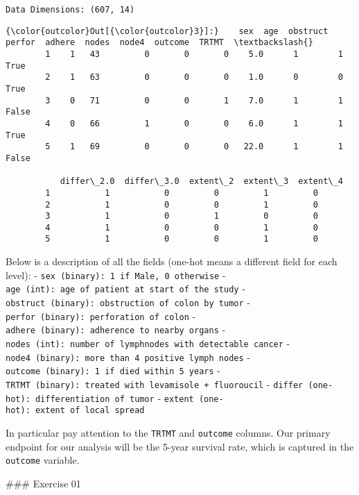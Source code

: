 \documentclass[11pt]{article}
\begin{document}
    \begin{Verbatim}[commandchars=\\\{\}]
Data Dimensions: (607, 14)

    \end{Verbatim}

\begin{Verbatim}[commandchars=\\\{\}]
{\color{outcolor}Out[{\color{outcolor}3}]:}    sex  age  obstruct  perfor  adhere  nodes  node4  outcome  TRTMT  \textbackslash{}
        1    1   43         0       0       0    5.0      1        1   True   
        2    1   63         0       0       0    1.0      0        0   True   
        3    0   71         0       0       1    7.0      1        1  False   
        4    0   66         1       0       0    6.0      1        1   True   
        5    1   69         0       0       0   22.0      1        1  False   
        
           differ\_2.0  differ\_3.0  extent\_2  extent\_3  extent\_4  
        1           1           0         0         1         0  
        2           1           0         0         1         0  
        3           1           0         1         0         0  
        4           1           0         0         1         0  
        5           1           0         0         1         0  
\end{Verbatim}
            
    Below is a description of all the fields (one-hot means a different
field for each level): -
\texttt{sex\ (binary):\ 1\ if\ Male,\ 0\ otherwise} -
\texttt{age\ (int):\ age\ of\ patient\ at\ start\ of\ the\ study} -
\texttt{obstruct\ (binary):\ obstruction\ of\ colon\ by\ tumor} -
\texttt{perfor\ (binary):\ perforation\ of\ colon} -
\texttt{adhere\ (binary):\ adherence\ to\ nearby\ organs} -
\texttt{nodes\ (int):\ number\ of\ lymphnodes\ with\ detectable\ cancer}
- \texttt{node4\ (binary):\ more\ than\ 4\ positive\ lymph\ nodes} -
\texttt{outcome\ (binary):\ 1\ if\ died\ within\ 5\ years} -
\texttt{TRTMT\ (binary):\ treated\ with\ levamisole\ +\ fluoroucil} -
\texttt{differ\ (one-hot):\ differentiation\ of\ tumor} -
\texttt{extent\ (one-hot):\ extent\ of\ local\ spread}

    In particular pay attention to the \texttt{TRTMT} and \texttt{outcome}
columns. Our primary endpoint for our analysis will be the 5-year
survival rate, which is captured in the \texttt{outcome} variable.

     \#\#\# Exercise 01
\end{document}
